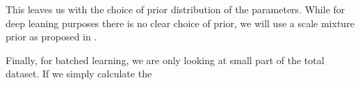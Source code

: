 This leaves us with the choice of prior distribution of the parameters.
While for deep leaning purposes there is no clear choice of prior, we will use a scale mixture prior as proposed in \cite{blundell_weight_2015}.

Finally, for batched learning, we are only looking at small part of the total dataset.
If we simply calculate the  



